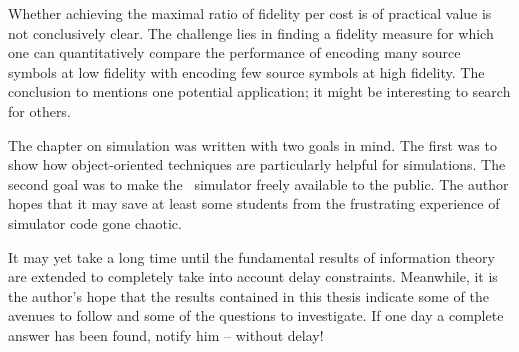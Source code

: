 Whether achieving the maximal ratio of fidelity per cost is of practical value
is not conclusively clear. The challenge lies in finding a fidelity measure for
which one can quantitatively compare the performance of encoding many source
symbols at low fidelity with encoding few source symbols at high fidelity. The
conclusion to  mentions one potential application; it might
be interesting to search for others. 


\medbreak

The chapter on simulation was written with two goals in mind. The first was to
show how object-oriented techniques are particularly helpful for simulations.
The second goal was to make the \jscsim\ simulator freely available to the
public. The author hopes that it may save at least some students from the
frustrating experience of simulator code gone chaotic. 

\medbreak

It may yet take a long time until the fundamental results of information theory
are extended to completely take into account delay constraints. Meanwhile, it is
the author's hope that the results contained in this thesis indicate some of the
avenues to follow and some of the questions to investigate. If one day a
complete answer has been found, notify him -- without delay!
